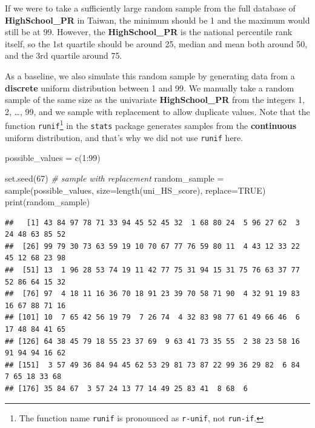 \documentclass[
]{article}
\newenvironment{Shaded}{\begin{snugshade}}{\end{snugshade}}
\newcommand{\AttributeTok}[1]{\textcolor[rgb]{0.77,0.63,0.00}{#1}}
\newcommand{\CommentTok}[1]{\textcolor[rgb]{0.56,0.35,0.01}{\textit{#1}}}
\newcommand{\ConstantTok}[1]{\textcolor[rgb]{0.00,0.00,0.00}{#1}}
\newcommand{\DecValTok}[1]{\textcolor[rgb]{0.00,0.00,0.81}{#1}}
\newcommand{\FunctionTok}[1]{\textcolor[rgb]{0.00,0.00,0.00}{#1}}
\newcommand{\NormalTok}[1]{#1}
\newcommand{\OtherTok}[1]{\textcolor[rgb]{0.56,0.35,0.01}{#1}}
\newcommand{\SpecialCharTok}[1]{\textcolor[rgb]{0.00,0.00,0.00}{#1}}
\begin{document}
If we were to take a sufficiently large random sample from the full
database of \textbf{HighSchool\_PR} in Taiwan, the minimum should be 1
and the maximum would still be at 99. However, the
\textbf{HighSchool\_PR} is the national percentile rank itself, so the
1st quartile should be around 25, median and mean both around 50, and
the 3rd quartile around 75.

As a baseline, we also simulate this random sample by generating data
from a \textbf{discrete} uniform distribution between 1 and 99. We
manually take a random sample of the same size as the univariate
\textbf{HighSchool\_PR} from the integers 1, 2, \ldots, 99, and we
sample with replacement to allow duplicate values. Note that the
function
\texttt{runif}\footnote{The function name \texttt{runif} is pronounced as \texttt{r-unif}, not \texttt{run-if}.}
in the \texttt{stats} package generates samples from the
\textbf{continuous} uniform distribution, and that's why we did not use
\texttt{runif} here.

\begin{Shaded}
\begin{Highlighting}[]
\NormalTok{possible\_values }\OtherTok{=} \FunctionTok{c}\NormalTok{(}\DecValTok{1}\SpecialCharTok{:}\DecValTok{99}\NormalTok{)}

\FunctionTok{set.seed}\NormalTok{(}\DecValTok{67}\NormalTok{)}
\CommentTok{\# sample with replacement}
\NormalTok{random\_sample }\OtherTok{=} \FunctionTok{sample}\NormalTok{(possible\_values, }\AttributeTok{size=}\FunctionTok{length}\NormalTok{(uni\_HS\_score), }\AttributeTok{replace=}\ConstantTok{TRUE}\NormalTok{)}
\FunctionTok{print}\NormalTok{(random\_sample)}
\end{Highlighting}
\end{Shaded}

\begin{verbatim}
##   [1] 43 84 97 78 71 33 94 45 52 45 32  1 68 80 24  5 96 27 62  3 24 48 63 85 52
##  [26] 99 79 30 73 63 59 19 10 70 67 77 76 59 80 11  4 43 12 33 22 45 12 68 23 98
##  [51] 13  1 96 28 53 74 19 11 42 77 75 31 94 15 31 75 76 63 37 77 52 86 64 15 32
##  [76] 97  4 18 11 16 36 70 18 91 23 39 70 58 71 90  4 32 91 19 83 16 67 88 71 16
## [101] 10  7 65 42 56 19 79  7 26 74  4 32 83 98 77 61 49 66 46  6 17 48 84 41 65
## [126] 64 38 45 79 18 55 23 37 69  9 63 41 73 35 55  2 38 23 58 16 91 94 94 16 62
## [151]  3 57 49 36 84 94 45 62 53 29 81 73 87 22 99 36 29 82  6 84  7 65 18 33 68
## [176] 35 84 67  3 57 24 13 77 14 49 25 83 41  8 68  6
\end{verbatim}
\end{document}
